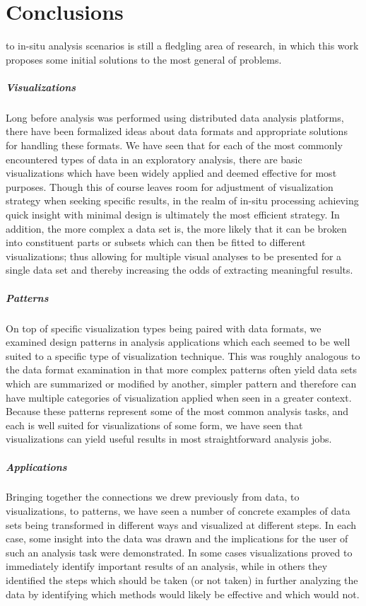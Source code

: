 \chapter{Conclusions}
\label{sec:conclusions}
 to in-situ analysis scenarios is still a fledgling area of research, in which this work proposes some initial solutions to the most general of problems. 

\paragraph{Visualizations}
Long before analysis was performed using distributed data analysis platforms, there have been formalized ideas about data formats and appropriate solutions for handling these formats. We have seen that for each of the most commonly encountered types of data in an exploratory analysis, there are basic visualizations which have been widely applied and deemed effective for most purposes. Though this of course leaves room for adjustment of visualization strategy when seeking specific results, in the realm of in-situ processing achieving quick insight with minimal design is ultimately the most efficient strategy. In addition, the more complex a data set is, the more likely that it can be broken into constituent parts or subsets which can then be fitted to different visualizations; thus allowing for multiple visual analyses to be presented for a single data set and thereby increasing the odds of extracting meaningful results. 

\paragraph{Patterns}
On top of specific visualization types being paired with data formats, we examined design patterns in analysis applications which each seemed to be well suited to a specific type of visualization technique. This was roughly analogous to the data format examination in that more complex patterns often yield data sets which are summarized or modified by another, simpler pattern and therefore can have multiple categories of visualization applied when seen in a greater context. Because these patterns represent some of the most common analysis tasks, and each is well suited for visualizations of some form, we have seen that visualizations can yield useful results in most straightforward analysis jobs.

\paragraph{Applications}
Bringing together the connections we drew previously from data, to visualizations, to patterns, we have seen a number of concrete examples of data sets being transformed in different ways and visualized at different steps. In each case, some insight into the data was drawn and the implications for the user of such an analysis task were demonstrated. In some cases visualizations proved to immediately identify important results of an analysis, while in others they identified the steps which should be taken (or not taken) in further analyzing the data by identifying which methods would likely be effective and which would not.


